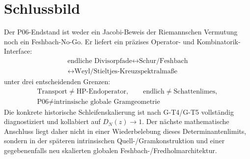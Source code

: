 \documentclass[11pt,a4paper]{amsart}
\begin{document}
\section{Schlussbild}

Der P06-Endstand ist weder ein Jacobi-Beweis der Riemannschen Vermutung noch
ein Feshbach-No-Go. Er liefert ein präzises Operator- und
Kombinatorik-Interface:
\[
\boxed{\begin{gathered}
\text{endliche Divisorpfade}\longleftrightarrow\text{Schur/Feshbach}\\
\longleftrightarrow\text{Weyl/Stieltjes-Kreuzspektralmaße}
\end{gathered}}
\]
unter drei entscheidenden Grenzen:
\[
\boxed{\begin{gathered}
\text{Transport}\neq\text{HP-Endoperator},\qquad
\text{endlich}\neq\text{Schattenlimes},\\
\text{P06}\neq\text{intrinsische globale Gramgeometrie}
\end{gathered}}
\]
Die konkrete historische Schleifenskalierung ist nach G-T4/G-T5 vollständig
diagnostiziert und kollabiert auf $D_N(z)\to1$. Der nächste mathematische
Anschluss liegt daher nicht in einer Wiederbelebung dieses Determinantenlimits,
sondern in der späteren intrinsischen Quell-/Gramkonstruktion und einer
gegebenenfalls neu skalierten globalen Feshbach-/Fredholmarchitektur.
\end{document}
